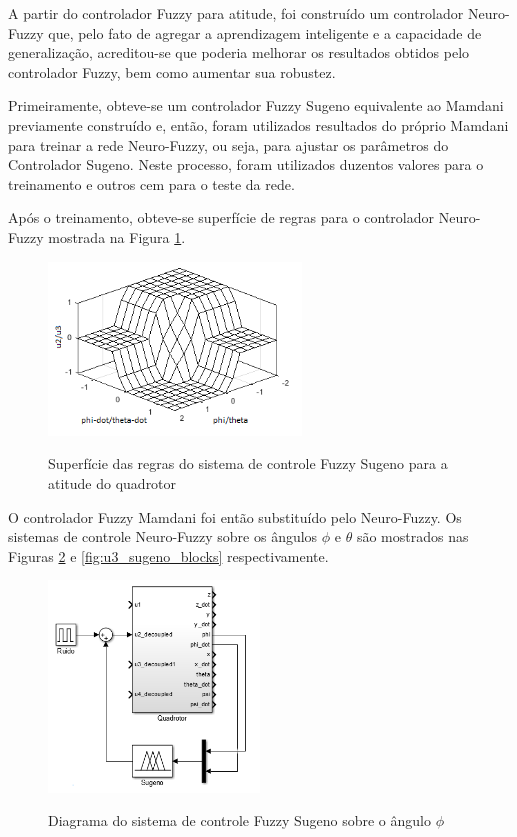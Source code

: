 A partir do controlador Fuzzy para atitude, foi construído um controlador Neuro-Fuzzy que, pelo fato de agregar a aprendizagem inteligente e a capacidade de generalização, acreditou-se que poderia melhorar os resultados obtidos pelo controlador Fuzzy, bem como aumentar sua robustez.

Primeiramente, obteve-se um controlador Fuzzy Sugeno equivalente ao Mamdani previamente construído e, então, foram utilizados resultados do próprio Mamdani para treinar a rede Neuro-Fuzzy, ou seja, para ajustar os parâmetros do Controlador Sugeno. Neste processo, foram utilizados duzentos valores para o treinamento e outros cem para o teste da rede.


Após o treinamento, obteve-se superfície de regras para o controlador Neuro-Fuzzy mostrada na Figura \ref{fig:u2_u3_sugeno_surface}.

\begin{figure}[!htb]
    \centering
    \caption{Superfície das regras do sistema de controle Fuzzy Sugeno para a atitude do quadrotor}
    \includegraphics[width=0.6\textwidth]{./04-figuras/resultados/fis_u3/u2_u3_sugeno_surface}
    \label{fig:u2_u3_sugeno_surface}
\end{figure}

O controlador Fuzzy Mamdani foi então substituído pelo Neuro-Fuzzy. Os sistemas de controle Neuro-Fuzzy sobre os ângulos $\phi$ e $\theta$ são mostrados nas Figuras \ref{fig:u2_sugeno_blocks} e \ref{fig:u3_sugeno_blocks} respectivamente.

\begin{figure}[!htb]
    \centering
    \caption{Diagrama do sistema de controle Fuzzy Sugeno sobre o ângulo $\phi$}
    \includegraphics[width=0.5\textwidth]{./04-figuras/resultados/fis_u2/u2_sugeno_blocks}
    \label{fig:u2_sugeno_blocks}
\end{figure}

